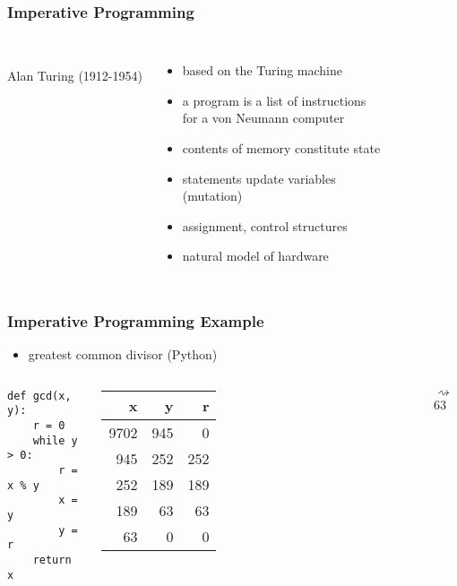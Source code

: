 \documentclass[dvipsnames]{beamer}
\theoremstyle{plain}
\begin{document}
\begin{frame}
  \frametitle{Imperative Programming}

  \begin{columns}
    \begin{center}
      \\
      Alan Turing (1912-1954)
    \end{center}

    \begin{itemize}
      \item based on the Turing machine
      \item a program is a list of instructions\\
        for a von Neumann computer
      \item contents of memory constitute \alert{state}

      \pause
      \medskip
      \item statements update variables\\
        (\alert{mutation})
      \item assignment, control structures
      \item natural model of hardware
    \end{itemize}
  \end{columns}
\end{frame}

\begin{frame}[fragile]
  \frametitle{Imperative Programming Example}

  \begin{itemize}
    \item greatest common divisor (Python)
  \end{itemize}

  \medskip
  \begin{columns}
    \begin{lstlisting}
def gcd(x, y):
    r = 0
    while y > 0:
        r = x % y
        x = y
        y = r
    return x
    \end{lstlisting}

    \begin{tabular}{|r|r|r|}\hline
   x &   y &   r\\\hline\hline
9702 & 945 &   0\\\hline
 945 & 252 & 252\\\hline
 252 & 189 & 189\\\hline
 189 &  63 &  63\\\hline
  63 &   0 &   0\\\hline
    \end{tabular}

    \medskip
    $\rightsquigarrow$ 63
  \end{columns}
\end{frame}
\end{document}
